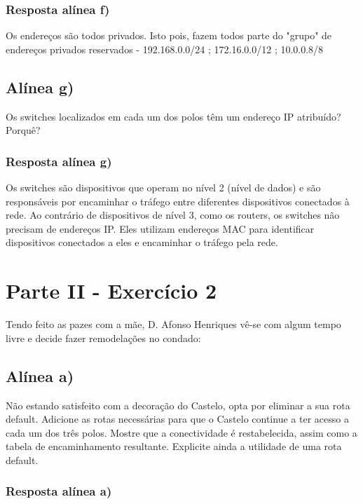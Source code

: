 \documentclass{article}
\begin{document}
\subsubsection{Resposta alínea f)}

Os endereços são todos privados. Isto pois, fazem todos parte do "grupo" de endereços privados reservados - 192.168.0.0/24 ; 172.16.0.0/12 ; 10.0.0.8/8

\subsection{Alínea g)}
Os switches localizados em cada um dos polos têm um endereço IP atribuído? Porquê?

\subsubsection{Resposta alínea g)}

Os switches são dispositivos que operam no nível 2 (nível de dados) e são responsáveis por encaminhar o tráfego entre diferentes dispositivos conectados à rede. Ao contrário de dispositivos de nível 3, como os routers, os switches não precisam de endereços IP. Eles utilizam endereços MAC para identificar dispositivos conectados a eles e encaminhar o tráfego pela rede.
\pagebreak

\section{Parte II - Exercício 2}

Tendo feito as pazes com a mãe, D. Afonso Henriques vê-se com algum tempo livre e decide fazer remodelações no condado:

\subsection{Alínea a)}

Não estando satisfeito com a decoração do Castelo, opta por eliminar a sua rota default.
Adicione as rotas necessárias para que o Castelo continue a ter acesso a cada um dos três polos. Mostre que a
conectividade é restabelecida, assim como a tabela de encaminhamento resultante. Explicite ainda a utilidade de
uma rota default.

\subsubsection{Resposta alínea a)}
\end{document}
